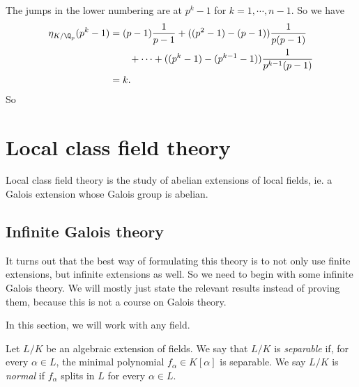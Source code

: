 \documentclass[a4paper]{article}
\begin{document}
\begin{eg}
\begin{center}
  \end{center}
  The jumps in the lower numbering are at $p^k - 1$ for $k = 1, \cdots, n -1 $. So we have
  \begin{align*}
    \eta_{K/\Q_p}(p^k - 1) &= (p - 1)\frac{1}{p - 1} + ((p^2 - 1) - (p - 1))\frac{1}{p(p - 1)} \\
    &\quad\quad+ \cdots + ((p^k - 1) - (p^{k - 1} - 1)) \frac{1}{p^{k - 1}(p - 1)} \\
    &= k.
  \end{align*}
  So
\end{eg}

\section{Local class field theory}
Local class field theory is the study of abelian extensions of local fields, ie. a Galois extension whose Galois group is abelian.

\subsection{Infinite Galois theory}
It turns out that the best way of formulating this theory is to not only use finite extensions, but infinite extensions as well. So we need to begin with some infinite Galois theory. We will mostly just state the relevant results instead of proving them, because this is not a course on Galois theory.

In this section, we will work with any field.
\begin{defi}
  Let $L/K$ be an algebraic extension of fields. We say that $L/K$ is \emph{separable} if, for every $\alpha \in L$, the minimal polynomial $f_\alpha \in K[\alpha]$ is separable. We say $L/K$ is \emph{normal} if $f_\alpha$ splits in $L$ for every $\alpha \in L$.
\end{defi}
\end{document}
